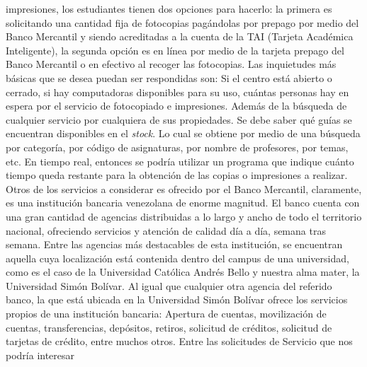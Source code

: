 \documentclass[12pt,a4paper,spanish]{article}
\begin{document}
impresiones, los estudiantes tienen dos opciones para hacerlo: la
primera es solicitando una cantidad fija de fotocopias pag\'andolas
por prepago por medio del Banco Mercantil y siendo acreditadas a la
cuenta de la TAI (Tarjeta Acad\'emica Inteligente), la segunda opci\'on
es en l\'inea por medio de la tarjeta prepago del Banco Mercantil o en
efectivo al recoger las fotocopias.
\newline
\newline
\indent Las inquietudes m\'as b\'asicas que se desea puedan ser respondidas
son: Si el centro est\'a abierto o cerrado, si hay computadoras
disponibles para su uso, cu\'antas personas hay en espera por el
servicio de fotocopiado e impresiones. Adem\'as de la b\'usqueda de
cualquier servicio por cualquiera de sus propiedades.
\newline
\newline
\indent Se debe saber qu\'e gu\'ias se encuentran disponibles en el \emph{stock}. 
Lo cual se obtiene por medio de una b\'usqueda por categor\'ia, por c\'odigo de
asignaturas, por nombre de profesores, por temas, etc. En tiempo real, entonces se podr\'ia utilizar
un programa que indique cu\'anto tiempo queda restante para la obtenci\'on de las copias o impresiones 
a realizar.
\newline
\newline
\indent Otros de los servicios a considerar es ofrecido por el Banco Mercantil, claramente, es una instituci\'on bancaria venezolana de enorme magnitud. 
El banco cuenta con una gran cantidad de agencias distribuidas a lo 
largo y ancho de todo el territorio nacional, ofreciendo servicios y atenci\'on de 
calidad d\'ia a d\'ia, semana tras semana. Entre las agencias m\'as destacables de 
esta instituci\'on, se encuentran aquella cuya localizaci\'on est\'a contenida dentro 
del campus de una universidad, como es el caso de la Universidad Cat\'olica Andr\'es 
Bello y nuestra alma mater, la Universidad Sim\'on Bol\'ivar. 
\newline
\newline
\indent Al igual que cualquier otra agencia del referido banco, la que est\'a ubicada en la Universidad Sim\'on Bol\'ivar ofrece los servicios propios de una 
instituci\'on bancaria: Apertura de cuentas, movilizaci\'on de cuentas, transferencias, dep\'ositos, retiros, solicitud de cr\'editos, solicitud de tarjetas de cr\'edito, entre muchos otros.
\newline
\newline
\indent Entre las solicitudes de Servicio que nos podr\'ia interesar
\end{document}
